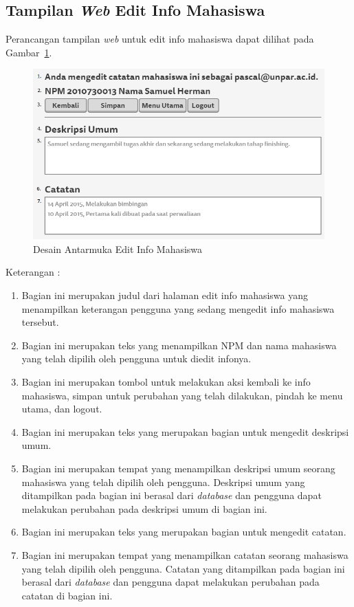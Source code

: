 \subsection{Tampilan {\it Web} Edit Info Mahasiswa}
Perancangan tampilan {\it web} untuk edit info mahasiswa dapat dilihat pada Gambar~\ref{fig:editmahasiswa}.
\begin{figure}[ht]
\centering
\includegraphics[scale=0.8]{Gambar/editmahasiswa.png}
\caption[Desain Antarmuka Edit Info Mahasiswa]{Desain Antarmuka Edit Info Mahasiswa}
\label{fig:editmahasiswa}
\end{figure}

Keterangan :
\begin{enumerate}[(1)]
\item
Bagian ini merupakan judul dari halaman edit info mahasiswa yang menampilkan keterangan pengguna yang sedang mengedit info mahasiswa tersebut.
\item
Bagian ini merupakan teks yang menampilkan NPM dan nama mahasiswa yang telah dipilih oleh pengguna untuk diedit infonya.
\item
Bagian ini merupakan tombol untuk melakukan aksi kembali ke info mahasiswa, simpan untuk perubahan yang telah dilakukan, pindah ke menu utama, dan logout.
\item
Bagian ini merupakan teks yang merupakan bagian untuk mengedit deskripsi umum.
\item
Bagian ini merupakan tempat yang menampilkan deskripsi umum seorang mahasiswa yang telah dipilih oleh pengguna. Deskripsi umum yang ditampilkan pada bagian ini berasal dari {\it database} dan pengguna dapat melakukan perubahan pada deskripsi umum di bagian ini.
\item
Bagian ini merupakan teks yang merupakan bagian untuk mengedit catatan.
\item
Bagian ini merupakan tempat yang menampilkan catatan seorang mahasiswa yang telah dipilih oleh pengguna. Catatan yang ditampilkan pada bagian ini berasal dari {\it database} dan pengguna dapat melakukan perubahan pada catatan di bagian ini.
\end{enumerate}

